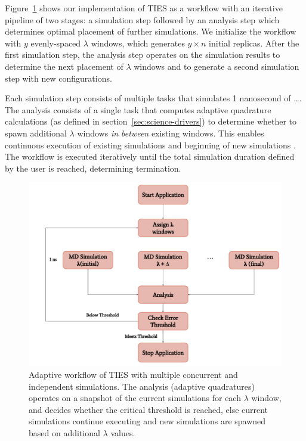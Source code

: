 Figure~\ref{fig:adaptive_ties} shows our implementation of TIES as a workflow
with an iterative pipeline of two stages: a simulation step followed by an
analysis step which determines optimal placement  of further
simulations. We initialize the workflow with $y$ evenly-spaced $\lambda$
windows, which generates $y \times n$ initial replicas. After the first
simulation step, the analysis step operates on the simulation results to
determine the next placement of $\lambda$ windows and to generate a second
simulation step with new configurations. 

Each simulation step consists of multiple tasks that simulates 1 nanosecond
of \ldots {}. The analysis
consists of a single task that computes adaptive quadrature calculations (as
defined in section~\ref{sec:science-drivers}) to determine whether to spawn
additional $\lambda$ windows \textit{in between} existing windows. This
enables continuous execution of existing simulations and beginning of new
simulations .
The workflow is executed iteratively until the total simulation duration
defined by the user is reached, determining termination.

\begin{figure}
  \centering
  \includegraphics[width=\columnwidth]{figures/adaptive_TIES_workflow_diagram.pdf}
  \caption{Adaptive workflow of TIES with multiple concurrent and independent
  simulations. The analysis (adaptive quadratures) operates on a snapshot of
  the current simulations for each $\lambda$ window, and decides whether the
  critical threshold is reached, else current simulations continue executing
  and new simulations are spawned based on additional $\lambda$ values.}
\label{fig:adaptive_ties}
\end{figure}

